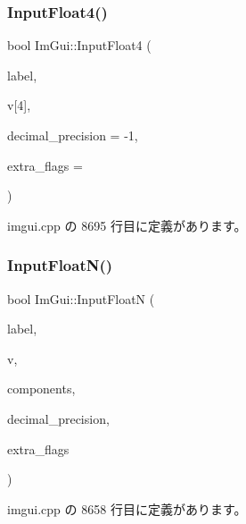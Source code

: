 \subsubsection{\texorpdfstring{Input\+Float4()}{InputFloat4()}}
{\footnotesize\ttfamily bool Im\+Gui\+::\+Input\+Float4 (\begin{DoxyParamCaption}\item[{const char $\ast$}]{label,  }\item[{float}]{v\mbox{[}4\mbox{]},  }\item[{int}]{decimal\+\_\+precision = {\ttfamily -\/1},  }\item[{\mbox{\hyperlink{imgui_8h_a7d2c6153a6b9b5d3178ce82434ac9fb8}{Im\+Gui\+Input\+Text\+Flags}}}]{extra\+\_\+flags = {} }\end{DoxyParamCaption})}



 imgui.\+cpp の 8695 行目に定義があります。

\mbox{\label{namespace_im_gui_a7fe2c74d1c0042b77d8e6788faed0983}} 
\subsubsection{\texorpdfstring{Input\+Float\+N()}{InputFloatN()}}
{\footnotesize\ttfamily bool Im\+Gui\+::\+Input\+FloatN (\begin{DoxyParamCaption}\item[{const char $\ast$}]{label,  }\item[{float $\ast$}]{v,  }\item[{int}]{components,  }\item[{int}]{decimal\+\_\+precision,  }\item[{\mbox{\hyperlink{imgui_8h_a7d2c6153a6b9b5d3178ce82434ac9fb8}{Im\+Gui\+Input\+Text\+Flags}}}]{extra\+\_\+flags }\end{DoxyParamCaption})}



 imgui.\+cpp の 8658 行目に定義があります。

\mbox{\label{namespace_im_gui_a8b5e9de08c18d6053d2f718b99be94a6}} 
